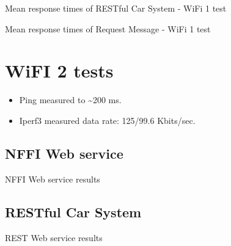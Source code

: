 \begin{appendices}
\begin{table}[H]

\caption{Mean response times of RESTful Car System - WiFi 1 test}
\end{table}

\begin{table}[H]

\caption{Mean response times of Request Message - WiFi 1 test}
\end{table}


\section{WiFI 2 tests}

\begin{itemize}
	\item Ping measured to \textasciitilde 200 ms.
	\item Iperf3 measured data rate: 125/99.6 Kbits/sec.
\end{itemize}

\subsection{NFFI Web service}

\begin{table}[H]

\caption{NFFI Web service results}
\end{table}

\subsection{RESTful Car System}

\begin{table}[H]

\caption{REST Web service results}
\end{table}


\end{appendices}
